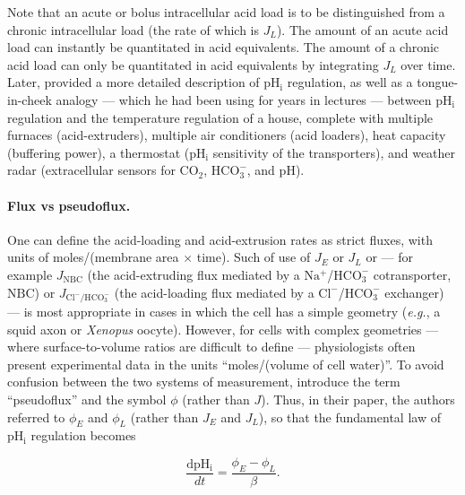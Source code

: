 \documentclass[fleqn,10pt]{physiome}
\begin{document}
Note that an acute or bolus intracellular acid load is to be distinguished from a chronic intracellular load (the rate of which is $J_L$). The amount of an acute acid load can instantly be quantitated in acid equivalents. The amount of a chronic acid load can only be quantitated in acid equivalents by integrating $J_L$ over time.\\

Later, \cite{boron2004regulation} provided a more detailed description of $\mathrm{pH_i}$ regulation, as well as a tongue-in-cheek analogy --- which he had been using for years in lectures --- between $\mathrm{pH_i}$ regulation and the temperature regulation of a house, complete with multiple furnaces (acid-extruders), multiple air conditioners (acid loaders), heat capacity (buffering power), a thermostat ($\mathrm{pH_i}$ sensitivity of the transporters), and weather radar (extracellular sensors for $\mathrm{CO_2}$, $\mathrm{HCO_3^-}$, and $\mathrm{pH}$).\\

\paragraph{Flux vs pseudoflux.} One can define the acid-loading and acid-extrusion rates as strict fluxes, with units of moles/(membrane area $\times$ time). Such of use of $J_E$ or $J_L$ or --- for example $J_\mathrm{NBC}$ (the acid-extruding flux mediated by a $\mathrm{Na^+}$/$\mathrm{HCO_3^-}$ cotransporter, $\mathrm{NBC}$) or $J_\mathrm{Cl^-/HCO_3^-}$ (the acid-loading flux mediated by a $\mathrm{Cl^-}$/$\mathrm{HCO_3^-}$ exchanger) --- is most appropriate in cases in which the cell has a simple geometry (\emph{e.g.}, a squid axon or \emph{Xenopus} oocyte). However, for cells with complex geometries --- where surface-to-volume ratios are difficult to define --- physiologists often present experimental data in the units ``moles/(volume of cell water)''. To avoid confusion between the two systems of measurement, \cite{bevensee1995} introduce the term ``pseudoflux'' and the symbol $\phi$ (rather than $J$). Thus, in their paper, the authors referred to $\phi_E$ and $\phi_L$ (rather than $J_E$ and $J_L$), so that the fundamental law of $\mathrm{pH_i}$ regulation becomes

\begin{equation}
\dfrac{\mathrm{dpH_i}}{dt}=\dfrac{\phi_E-\phi_L}{\beta}.
\label{eqn:fund3}
\end{equation}
\end{document}
